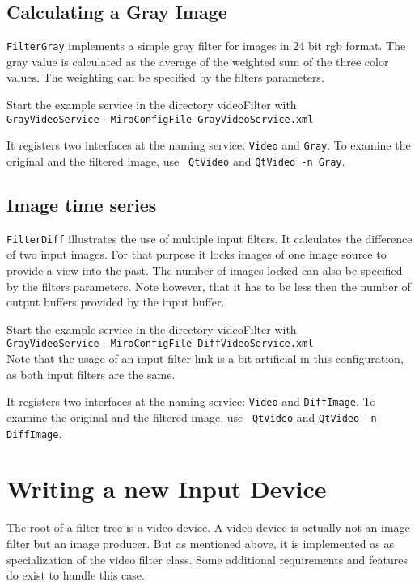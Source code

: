 \subsection{Calculating a Gray Image}

{\tt FilterGray} implements a simple gray
filter for images in 24 bit rgb format. The gray value is calculated
as the average of the weighted sum of the three color values. The
weighting can be specified by the filters parameters.

Start the example service in the directory videoFilter with \\
{\tt GrayVideoService -MiroConfigFile GrayVideoService.xml}

It registers two interfaces at the naming service: {\tt Video} and
{\tt Gray}. To examine the original and the filtered image, use {\tt
  QtVideo} and {\tt QtVideo -n Gray}.

\subsection{Image time series}

{\tt FilterDiff} illustrates the use of multiple input filters. It
calculates the difference of two input images. For that purpose it
locks images of one image source to provide a view into the past. The
number of images locked can also be specified by the filters
parameters. Note however, that it has to be less then the number of
output buffers provided by the input buffer.

Start the example service in the directory videoFilter with \\
{\tt GrayVideoService -MiroConfigFile DiffVideoService.xml} \\
Note that the usage of an input filter link is a bit artificial in
this configuration, as both input filters are the same.

It registers two interfaces at the naming service: {\tt Video} and
{\tt DiffImage}. To examine the original and the filtered image, use {\tt
  QtVideo} and {\tt QtVideo -n DiffImage}.

\section{Writing a new Input Device}

The root of a filter tree is a video device. A video device is
actually not an image filter but an image producer. But as mentioned
above, it is implemented as as specialization of the video filter
class. Some additional requirements and features do exist to handle
this case.


